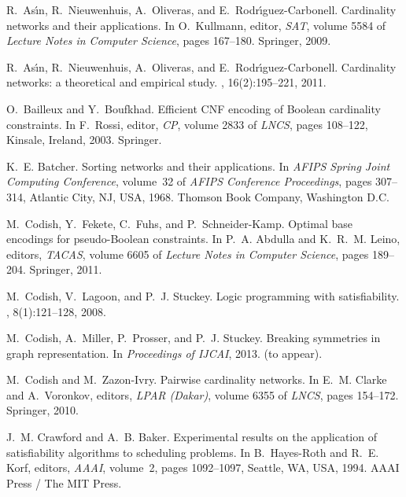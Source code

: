 \documentclass[runningheads,a4paper]{llncs}
\begin{document}
\newcommand{\noopsort}[1]{}
\begin{thebibliography}{10}

R.~As\'{\i}n, R.~Nieuwenhuis, A.~Oliveras, and E.~Rodr\'{\i}guez-Carbonell.
\newblock Cardinality networks and their applications.
\newblock In O.~Kullmann, editor, {\em SAT}, volume 5584 of {\em Lecture Notes
  in Computer Science}, pages 167--180. Springer, 2009.

R.~As\'{\i}n, R.~Nieuwenhuis, A.~Oliveras, and E.~Rodr\'{\i}guez-Carbonell.
\newblock Cardinality networks: a theoretical and empirical study.
, 16(2):195--221, 2011.

O.~Bailleux and Y.~Boufkhad.
\newblock Efficient {CNF} encoding of {B}oolean cardinality constraints.
\newblock In F.~Rossi, editor, {\em CP}, volume 2833 of {\em LNCS}, pages
  108--122, Kinsale, Ireland, 2003. Springer.

K.~E. Batcher.
\newblock Sorting networks and their applications.
\newblock In {\em AFIPS Spring Joint Computing Conference}, volume~32 of {\em
  AFIPS Conference Proceedings}, pages 307--314, Atlantic City, NJ, USA, 1968.
  Thomson Book Company, Washington D.C.

M.~Codish, Y.~Fekete, C.~Fuhs, and P.~Schneider-Kamp.
\newblock Optimal base encodings for pseudo-{B}oolean constraints.
\newblock In P.~A. Abdulla and K.~R.~M. Leino, editors, {\em TACAS}, volume
  6605 of {\em Lecture Notes in Computer Science}, pages 189--204. Springer,
  2011.

M.~Codish, V.~Lagoon, and P.~J. Stuckey.
\newblock Logic programming with satisfiability.
, 8(1):121--128, 2008.

M.~Codish, A.~Miller, P.~Prosser, and P.~J. Stuckey.
\newblock Breaking symmetries in graph representation.
\newblock In {\em Proceedings of IJCAI}, 2013.
\newblock (to appear).

M.~Codish and M.~Zazon-Ivry.
\newblock Pairwise cardinality networks.
\newblock In E.~M. Clarke and A.~Voronkov, editors, {\em LPAR (Dakar)}, volume
  6355 of {\em LNCS}, pages 154--172. Springer, 2010.

J.~M. Crawford and A.~B. Baker.
\newblock Experimental results on the application of satisfiability algorithms
  to scheduling problems.
\newblock In B.~Hayes-Roth and R.~E. Korf, editors, {\em AAAI}, volume~2, pages
  1092--1097, Seattle, WA, USA, 1994. AAAI Press / The MIT Press.


\end{thebibliography}
\end{document}
